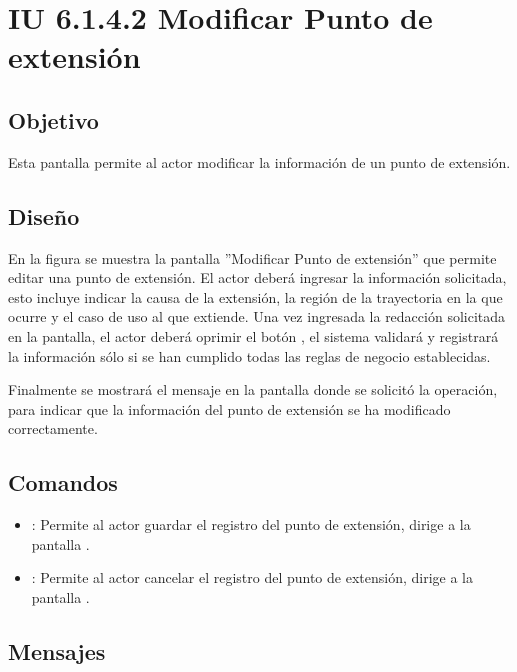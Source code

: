 \section{IU 6.1.4.2 Modificar Punto de extensión}

\subsection{Objetivo}
	Esta pantalla permite al actor modificar la información de un punto de extensión.
\subsection{Diseño}
	En la figura  se muestra la pantalla ''Modificar Punto de extensión'' que permite editar una punto de extensión. El actor deberá ingresar la información solicitada, esto incluye indicar la causa de la extensión, la región de la trayectoria en la que ocurre y el caso de uso al que extiende.
	Una vez ingresada la redacción solicitada en la pantalla, el actor deberá oprimir el botón , el sistema validará y registrará la información sólo si se han cumplido todas las reglas de negocio establecidas.
	
	Finalmente se mostrará el mensaje  en la pantalla donde se solicitó la operación, para indicar que la información del punto de extensión se ha modificado correctamente.

\subsection{Comandos}
\begin{itemize}
	\item {}: Permite al actor guardar el registro del punto de extensión, dirige a la pantalla .
	\item {}: Permite al actor cancelar el registro del punto de extensión, dirige a la pantalla .
\end{itemize}

\subsection{Mensajes}

